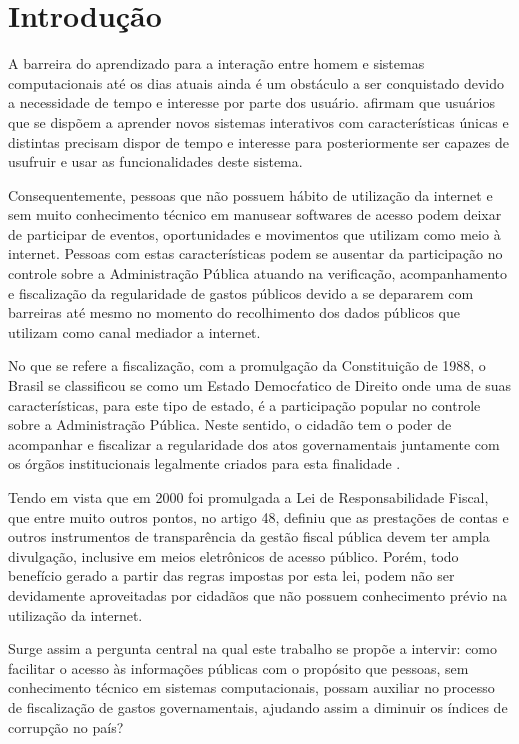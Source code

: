 \chapter{Introdução}
A barreira do aprendizado para a interação entre homem e sistemas computacionais até os dias atuais ainda é um obstáculo a ser conquistado devido a necessidade de tempo e interesse por parte dos usuário. \cite{Barbosa:2010} afirmam que usuários que se dispõem a aprender novos sistemas interativos com características únicas e distintas precisam dispor de tempo e interesse para posteriormente ser capazes de usufruir e usar as funcionalidades deste sistema.

Consequentemente, pessoas que não possuem hábito de utilização da internet e sem muito conhecimento técnico em manusear softwares de acesso podem deixar de participar de eventos, oportunidades e movimentos que utilizam como meio à internet. Pessoas com estas características podem se ausentar da participação no controle sobre a Administração Pública atuando na verificação, acompanhamento e fiscalização da regularidade de gastos públicos devido a se depararem com barreiras até mesmo no momento do recolhimento dos dados públicos que utilizam como canal mediador a internet.

No que se refere a fiscalização, com a promulgação da Constituição de 1988, o Brasil se classificou se como um Estado Democŕatico de Direito onde uma de suas características, para este tipo de estado, é a participação popular no controle sobre a Administração Pública. Neste sentido, o cidadão tem o poder de acompanhar e fiscalizar a regularidade dos atos governamentais juntamente com os órgãos institucionais legalmente criados para esta finalidade \cite{Arruda:2010}.

Tendo em vista que em 2000 foi promulgada a Lei de Responsabilidade Fiscal, que entre muito outros pontos, no artigo 48, definiu que as prestações de contas e outros instrumentos de transparência da gestão fiscal pública devem ter ampla divulgação, inclusive em meios eletrônicos de acesso público. Porém, todo benefício gerado a partir das regras impostas por esta lei, podem não ser devidamente aproveitadas por cidadãos que não possuem conhecimento prévio na utilização da internet.

Surge assim a pergunta central na qual este trabalho se propõe a intervir: como facilitar o acesso às informações públicas com o propósito que pessoas, sem conhecimento técnico em sistemas computacionais, possam auxiliar no processo de fiscalização de gastos governamentais, ajudando assim a diminuir os índices de corrupção no país?

